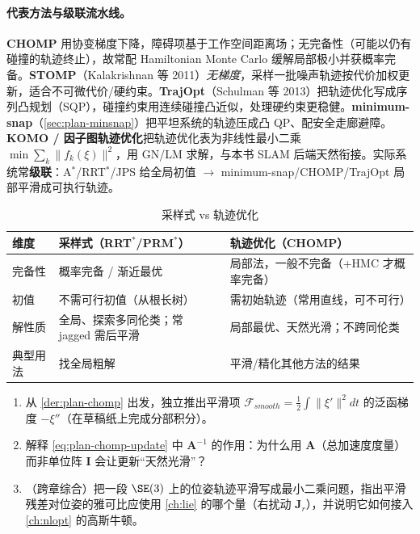 \paragraph{代表方法与级联流水线。}\rebuilt
\textbf{CHOMP} 用协变梯度下降，障碍项基于工作空间距离场；无完备性（可能以仍有碰撞的轨迹终止），故常配 Hamiltonian Monte Carlo 缓解局部极小并获概率完备。\textbf{STOMP}（Kalakrishnan 等 2011\cite{kalakrishnan2011stomp}）\emph{无梯度}，采样一批噪声轨迹按代价加权更新，适合不可微代价/硬约束。\textbf{TrajOpt}（Schulman 等 2013\cite{schulman2014trajopt}）把轨迹优化写成序列凸规划（SQP），碰撞约束用连续碰撞凸近似，处理硬约束更稳健。\textbf{minimum-snap}（\cref{sec:plan-minsnap}）把平坦系统的轨迹压成凸 QP、配安全走廊避障。\textbf{KOMO / 因子图轨迹优化}把轨迹优化表为非线性最小二乘 $\min\sum_k\|f_k(\xi)\|^2$，用 GN/LM 求解，与本书 SLAM 后端天然衔接。实际系统常\textbf{级联}：A$^*$/RRT$^*$/JPS 给全局初值 $\to$ minimum-snap/CHOMP/TrajOpt 局部平滑成可执行轨迹。

\begin{table}[H]\centering\small
\caption{采样式 vs 轨迹优化}
\label{tab:plan-traj-cmp}
\begin{tabular}{lll}
\toprule
维度 & 采样式（RRT$^*$/PRM$^*$） & 轨迹优化（CHOMP） \\
\midrule
完备性 & 概率完备 / 渐近最优 & 局部法，一般不完备（+HMC 才概率完备） \\
初值 & 不需可行初值（从根长树） & 需初始轨迹（常用直线，可不可行） \\
解性质 & 全局、探索多同伦类；常 jagged 需后平滑 & 局部最优、天然光滑；不跨同伦类 \\
典型用法 & 找全局粗解 & 平滑/精化其他方法的结果 \\
\bottomrule
\end{tabular}
\end{table}

\begin{practice}
\begin{enumerate}
  \item 从 \cref{der:plan-chomp} 出发，独立推出平滑项 $\mathcal{F}_{smooth}=\tfrac12\int\|\xi'\|^2dt$ 的泛函梯度 $-\xi''$（在草稿纸上完成分部积分）。
  \item 解释 \cref{eq:plan-chomp-update} 中 $\mathbf{A}^{-1}$ 的作用：为什么用 $\mathbf{A}$（总加速度度量）而非单位阵 $\mathbf{I}$ 会让更新“天然光滑”？
  \item （跨章综合）把一段 $\SE(3)$ 上的位姿轨迹平滑写成最小二乘问题，指出平滑残差对位姿的雅可比应使用 \cref{ch:lie} 的哪个量（右扰动 $\mathbf{J}_r$），并说明它如何接入 \cref{ch:nlopt} 的高斯牛顿。
\end{enumerate}
\end{practice}

